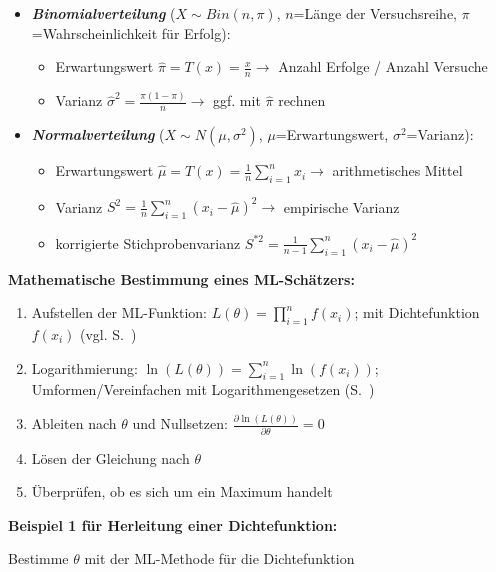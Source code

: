 \begin{itemize}
    \item \textbf{\emph{Binomialverteilung}} (\(X\sim Bin(n, \pi)\), \(n\)=Länge der Versuchsreihe, \(\pi\)=Wahrscheinlichkeit für Erfolg):
    \begin{itemize}
        \item Erwartungswert \(\hat{\pi}=T(x)=\frac{x}{n} \rightarrow \) Anzahl Erfolge / Anzahl Versuche
        \item Varianz \(\hat{\sigma}^2=\frac{\pi(1-\pi)}{n} \rightarrow \) ggf. mit \(\hat{\pi}\) rechnen
    \end{itemize}
    \item \textbf{\emph{Normalverteilung}} (\(X\sim N(\mu, \sigma^2)\), \(\mu\)=Erwartungswert, \(\sigma^2\)=Varianz):
    \begin{itemize}
        \item Erwartungswert \(\hat{\mu}=T(x)=\frac{1}{n}\sum_{i=1}^{n}x_i \rightarrow \) arithmetisches Mittel
        \item Varianz \(S^2=\frac{1}{n}\sum_{i=1}^{n}(x_i-\hat{\mu})^2 \rightarrow \) empirische Varianz
        \item korrigierte Stichprobenvarianz \(S^{*2}=\frac{1}{n-1}\sum_{i=1}^{n}(x_i-\hat{\mu})^2 \)
    \end{itemize}
\end{itemize}

\textbf{Mathematische Bestimmung eines ML-Schätzers:}

\begin{enumerate}
    \item Aufstellen der ML-Funktion: \(L(\theta)=\prod_{i=1}^{n}f(x_i)\); mit Dichtefunktion \(f(x_i)\) (vgl. S.~\pageref{verteilungen})
    \item Logarithmierung: \(\ln(L(\theta))=\sum_{i=1}^{n}\ln(f(x_i))\); Umformen/Vereinfachen mit Logarithmengesetzen (S.~\pageref{logarithmusgesetze})
    \item Ableiten nach \(\theta\) und Nullsetzen: \(\frac{\partial \ln(L(\theta))}{\partial \theta}=0\)
    \item Lösen der Gleichung nach \(\theta\)
    \item Überprüfen, ob es sich um ein Maximum handelt
\end{enumerate}

\textbf{Beispiel 1 für Herleitung einer Dichtefunktion:}

Bestimme \(\theta\) mit der ML-Methode für die Dichtefunktion\\


